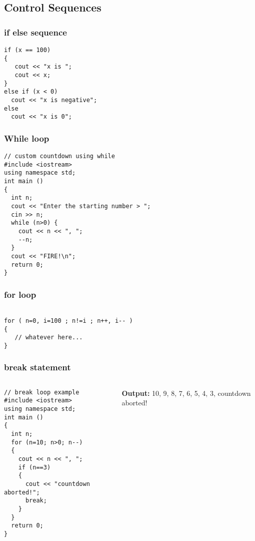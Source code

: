 \documentclass{beamer}
\newtheorem{Key points}{Key points}
\newcommand\Fontviaa{\fontsize{8}{7.2}\selectfont}
\begin{document}
\subsection{Control Sequences}
\begin{frame}[fragile]
\frametitle{if else sequence}
\begin{lstlisting}
if (x == 100)
{
   cout << "x is ";
   cout << x;
}
else if (x < 0)
  cout << "x is negative";
else
  cout << "x is 0";
\end{lstlisting}
\end{frame}
\begin{frame}[fragile]
\frametitle{While loop}
\begin{lstlisting}
// custom countdown using while
#include <iostream>
using namespace std;
int main ()
{
  int n;
  cout << "Enter the starting number > ";
  cin >> n;
  while (n>0) {
    cout << n << ", ";
    --n;
  }
  cout << "FIRE!\n";
  return 0;
}
\end{lstlisting}
\end{frame}
\begin{frame}[fragile]
\frametitle{for loop}
\begin{lstlisting}

for ( n=0, i=100 ; n!=i ; n++, i-- )
{
   // whatever here...
}
\end{lstlisting}
\end{frame}
\begin{frame}[fragile]
\frametitle{break statement}
\begin{columns}[onlytextwidth]
    \begin{column}{0.6\textwidth}
      \centering
\Fontviaa
\begin{lstlisting}
// break loop example
#include <iostream>
using namespace std;
int main ()
{
  int n;
  for (n=10; n>0; n--)
  {
    cout << n << ", ";
    if (n==3)
    {
      cout << "countdown aborted!";
      break;
    }
  }
  return 0;
}
\end{lstlisting}
    \end{column}
\pause    \begin{column}{0.3\textwidth}
      \centering
\textbf{{\color{blue}Output:}} 10, 9, 8, 7, 6, 5, 4, 3, countdown aborted!
    \end{column}
\end{columns}
\end{frame}
\end{document}
